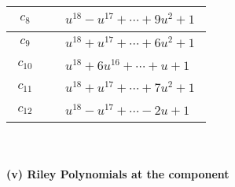 \documentclass[1p]{elsarticle_modified}
\theoremstyle{definition}
\begin{document}
\begin{tabular}{m{50pt}|m{274pt}}
\hline $$\begin{aligned}c_{8}\end{aligned}$$&$\begin{aligned}
&u^{18}- u^{17}+\cdots+9 u^2+1
\end{aligned}$\\
\hline $$\begin{aligned}c_{9}\end{aligned}$$&$\begin{aligned}
&u^{18}+u^{17}+\cdots+6 u^2+1
\end{aligned}$\\
\hline $$\begin{aligned}c_{10}\end{aligned}$$&$\begin{aligned}
&u^{18}+6 u^{16}+\cdots+u+1
\end{aligned}$\\
\hline $$\begin{aligned}c_{11}\end{aligned}$$&$\begin{aligned}
&u^{18}+u^{17}+\cdots+7 u^2+1
\end{aligned}$\\
\hline $$\begin{aligned}c_{12}\end{aligned}$$&$\begin{aligned}
&u^{18}- u^{17}+\cdots-2 u+1
\end{aligned}$\\
\hline
\end{tabular}\\~\\
\newpage\renewcommand{\arraystretch}{1}
\flushleft \textbf{(v) Riley Polynomials at the component}\newline \\
\end{document}
